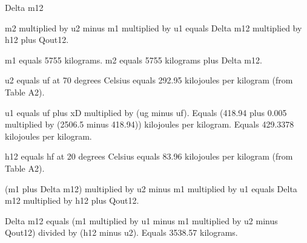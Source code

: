 Delta m12  

m2 multiplied by u2 minus m1 multiplied by u1 equals Delta m12 multiplied by h12 plus Qout12.  

m1 equals 5755 kilograms.  
m2 equals 5755 kilograms plus Delta m12.  

u2 equals uf at 70 degrees Celsius equals 292.95 kilojoules per kilogram (from Table A2).  

u1 equals uf plus xD multiplied by (ug minus uf).  
Equals (418.94 plus 0.005 multiplied by (2506.5 minus 418.94)) kilojoules per kilogram.  
Equals 429.3378 kilojoules per kilogram.  

h12 equals hf at 20 degrees Celsius equals 83.96 kilojoules per kilogram (from Table A2).  

(m1 plus Delta m12) multiplied by u2 minus m1 multiplied by u1 equals Delta m12 multiplied by h12 plus Qout12.  

Delta m12 equals (m1 multiplied by u1 minus m1 multiplied by u2 minus Qout12) divided by (h12 minus u2).  
Equals 3538.57 kilograms.